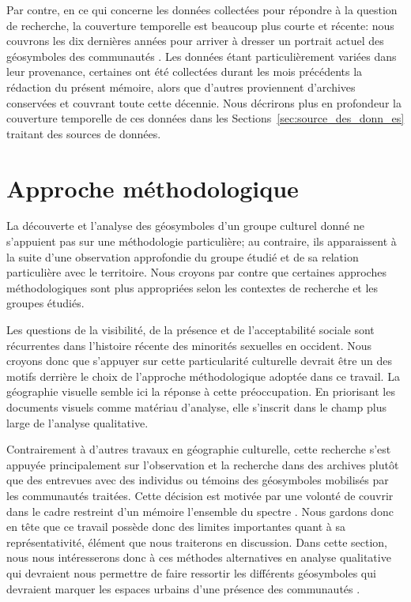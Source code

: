 Par contre, en ce qui concerne les données collectées pour répondre à la question de recherche, la couverture temporelle est beaucoup plus courte et récente: nous couvrons les dix dernières années pour arriver à dresser un portrait actuel des géosymboles des communautés \lgbt{}.
Les données étant particulièrement variées dans leur provenance, certaines ont été collectées durant les mois précédents la rédaction du présent mémoire, alors que d'autres proviennent d'archives conservées et couvrant toute cette décennie.
Nous décrirons plus en profondeur la couverture temporelle de ces données dans les Sections~\ref{sec:source_des_donn_es} traitant des sources de données.

\section{Approche méthodologique}
\label{sec:approche_m_thodologique}
La découverte et l'analyse des géosymboles d'un groupe culturel donné ne s'appuient pas sur une méthodologie particulière; au contraire, ils apparaissent à la suite d'une observation approfondie du groupe étudié et de sa relation particulière avec le territoire.
Nous croyons par contre que certaines approches méthodologiques sont plus appropriées selon les contextes de recherche et les groupes étudiés.

Les questions de la visibilité, de la présence et de l'acceptabilité sociale sont récurrentes dans l'histoire récente des minorités sexuelles en occident.
Nous croyons donc que s'appuyer sur cette particularité culturelle devrait être un des motifs derrière le choix de l'approche méthodologique adoptée dans ce travail.
La géographie visuelle semble ici la réponse à cette préoccupation.
En priorisant les documents visuels comme matériau d'analyse, elle s'inscrit dans le champ plus large de l'analyse qualitative.

Contrairement à d'autres travaux en géographie culturelle, cette recherche s'est appuyée principalement sur l'observation et la recherche dans des archives plutôt que des entrevues avec des individus \lgbt{} ou témoins des géosymboles mobilisés par les communautés traitées.
Cette décision est motivée par une volonté de couvrir dans le cadre restreint d'un mémoire l'ensemble du spectre \lgbt{}.
Nous gardons donc en tête que ce travail possède donc des limites importantes quant à sa représentativité, élément que nous traiterons en discussion.
Dans cette section, nous nous intéresserons donc à ces méthodes alternatives en analyse qualitative qui devraient nous permettre de faire ressortir les différents géosymboles qui devraient marquer les espaces urbains d'une présence des communautés \lgbt{}.

